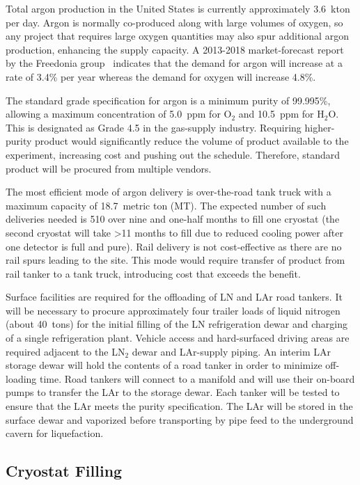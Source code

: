 Total argon production in the United States is currently approximately 3.6~kton per day.  Argon is normally co-produced along with large volumes 
of oxygen, so any project that requires large oxygen quantities may also spur additional argon production, enhancing the
supply capacity.  A 2013-2018 market-forecast report by the Freedonia group~\cite{freedonia} indicates that the demand for argon will increase at a rate of 3.4\% per year whereas the demand for oxygen will increase 4.8\%.  

The standard grade specification for argon is a minimum purity of 99.995\%, allowing a maximum concentration of 5.0~ppm for O$_2$ and 10.5~ppm for H$_{2}$O.  This is designated as Grade 4.5 in the gas-supply industry.  Requiring higher-purity product would significantly reduce the volume of product available to the experiment, increasing cost and pushing out the schedule.  
Therefore, standard product will be procured from multiple vendors.  

The most efficient mode of argon delivery is 
over-the-road tank truck with a maximum capacity of 18.7~metric ton (MT).  The expected number of such deliveries needed is 510 over nine and one-half months to fill one cryostat (the second cryostat will take >11 months to fill due to reduced cooling power after one detector is full and pure). 
Rail delivery 
is not cost-effective as there are no rail spurs leading to the site.
This mode would require transfer of product from rail tanker to a tank truck, introducing cost that exceeds the benefit.

Surface facilities are required for the offloading of LN and LAr road tankers. It will be necessary to  procure approximately four trailer loads of liquid nitrogen (about 40~tons) for the initial filling of the LN refrigeration dewar and charging of a single refrigeration plant. Vehicle access and hard-surfaced driving areas are required adjacent to the LN$_{2}$ dewar and LAr-supply piping. An interim LAr storage dewar will hold the contents of a road tanker in order to minimize off-loading time.  Road tankers will connect to a manifold and will use their on-board pumps to transfer the LAr to the storage 
dewar. Each tanker will be tested to ensure that the LAr meets the purity specification. The LAr will be 
stored in the surface dewar and vaporized before transporting by pipe feed to the
underground cavern for liquefaction.

\subsection{Cryostat Filling}

